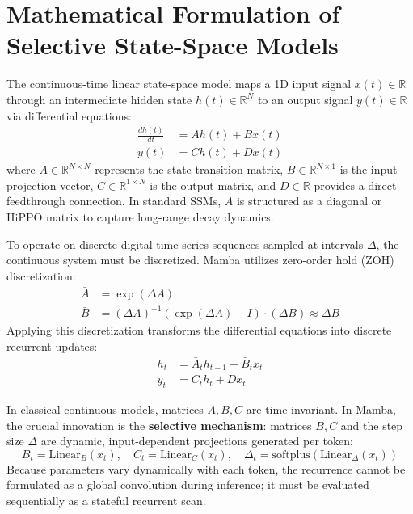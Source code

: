 \documentclass[11pt,a4paper,oneside]{report}
\begin{document}
\section{Mathematical Formulation of Selective State-Space Models}
The continuous-time linear state-space model maps a 1D input signal $x(t) \in \mathbb{R}$ through an intermediate hidden state $h(t) \in \mathbb{R}^N$ to an output signal $y(t) \in \mathbb{R}$ via differential equations:
\begin{align}
    \frac{dh(t)}{dt} &= A h(t) + B x(t) \label{eq:ssm_cont_state} \\
    y(t) &= C h(t) + D x(t) \label{eq:ssm_cont_out}
\end{align}
where $A \in \mathbb{R}^{N \times N}$ represents the state transition matrix, $B \in \mathbb{R}^{N \times 1}$ is the input projection vector, $C \in \mathbb{R}^{1 \times N}$ is the output matrix, and $D \in \mathbb{R}$ provides a direct feedthrough connection. In standard SSMs, $A$ is structured as a diagonal or HiPPO matrix to capture long-range decay dynamics.

To operate on discrete digital time-series sequences sampled at intervals $\Delta$, the continuous system must be discretized. Mamba utilizes zero-order hold (ZOH) discretization:
\begin{align}
    \bar{A} &= \exp(\Delta A) \label{eq:zoh_a} \\
    \bar{B} &= (\Delta A)^{-1} (\exp(\Delta A) - I) \cdot (\Delta B) \approx \Delta B \label{eq:zoh_b}
\end{align}
Applying this discretization transforms the differential equations into discrete recurrent updates:
\begin{align}
    h_t &= \bar{A}_t h_{t-1} + \bar{B}_t x_t \label{eq:disc_recurrence} \\
    y_t &= C_t h_t + D x_t \label{eq:disc_output}
\end{align}

In classical continuous models, matrices $A, B, C$ are time-invariant. In Mamba, the crucial innovation is the \textbf{selective mechanism}: matrices $B, C$ and the step size $\Delta$ are dynamic, input-dependent projections generated per token:
\begin{equation}
    B_t = \text{Linear}_B(x_t), \quad C_t = \text{Linear}_C(x_t), \quad \Delta_t = \text{softplus}(\text{Linear}_\Delta(x_t))
\end{equation}
Because parameters vary dynamically with each token, the recurrence cannot be formulated as a global convolution during inference; it must be evaluated sequentially as a stateful recurrent scan.
\end{document}
